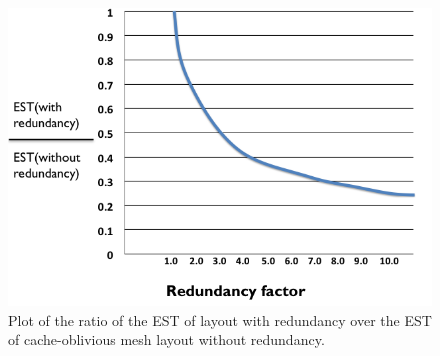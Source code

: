 \begin{figure}[ht]
\centering
\includegraphics[width=\columnwidth]{statistic.png}
  \caption{Plot of the ratio of the EST of layout with redundancy over the EST of cache-oblivious mesh layout without redundancy. }
  \label{fig:statistic}
\end{figure} 

